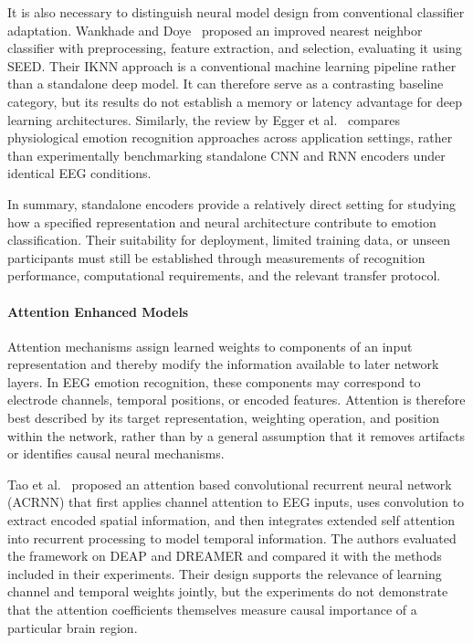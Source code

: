 \documentclass[ASNA,twocolumn]{USG}
\begin{document}
It is also necessary to distinguish neural model design from conventional classifier adaptation. Wankhade and Doye~\cite{wankhade2019ikkn} proposed an improved nearest neighbor classifier with preprocessing, feature extraction, and selection, evaluating it using SEED. Their IKNN approach is a conventional machine learning pipeline rather than a standalone deep model. It can therefore serve as a contrasting baseline category, but its results do not establish a memory or latency advantage for deep learning architectures. Similarly, the review by Egger et al.~\cite{egger2019emotion} compares physiological emotion recognition approaches across application settings, rather than experimentally benchmarking standalone CNN and RNN encoders under identical EEG conditions.

In summary, standalone encoders provide a relatively direct setting for studying how a specified representation and neural architecture contribute to emotion classification. Their suitability for deployment, limited training data, or unseen participants must still be established through measurements of recognition performance, computational requirements, and the relevant transfer protocol.

\paragraph{Attention Enhanced Models}
\label{sec:attention_enhanced_models}

Attention mechanisms assign learned weights to components of an input representation and thereby modify the information available to later network layers. In EEG emotion recognition, these components may correspond to electrode channels, temporal positions, or encoded features. Attention is therefore best described by its target representation, weighting operation, and position within the network, rather than by a general assumption that it removes artifacts or identifies causal neural mechanisms.

Tao et al.~\cite{tao2020eeg} proposed an attention based convolutional recurrent neural network (ACRNN) that first applies channel attention to EEG inputs, uses convolution to extract encoded spatial information, and then integrates extended self attention into recurrent processing to model temporal information. The authors evaluated the framework on DEAP and DREAMER and compared it with the methods included in their experiments. Their design supports the relevance of learning channel and temporal weights jointly, but the experiments do not demonstrate that the attention coefficients themselves measure causal importance of a particular brain region.
\end{document}
